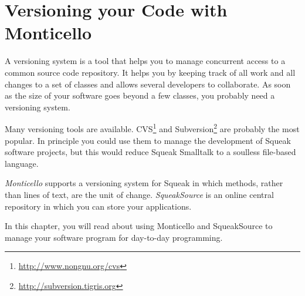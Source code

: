 \documentclass[a4paper,10pt,twoside]{book}
\begin{document}
	\sloppy
\fi

\newcommand{\figlabel}[1]{\label{fig:#1}}
\newcommand{\seclabel}[1]{\label{sec:#1}}

\chapter{Versioning your Code with Monticello}


\noindent
{}


A versioning system is a tool that helps you to manage concurrent access to a common source code repository. It helps you by keeping track of all work and all changes to a set of classes and allows several developers to collaborate. As soon as the size of your software goes beyond a few classes, you probably need a versioning system.

Many versioning tools are available. CVS\footnote{\url{http://www.nongnu.org/cvs}} and Subversion\footnote{\url{http://subversion.tigris.org}} are probably the most popular.
In principle you could use them to manage the development of Squeak software projects, but this would reduce Squeak Smalltalk to a soulless file-based language. 

\emph{Monticello} supports a versioning system for Squeak in which methods, rather than lines of text,
are the unit of change. \emph{SqueakSource} is an online central repository in which you can store your applications.

In this chapter, you will read about using Monticello and SqueakSource to manage your software program for day-to-day programming.
\end{document}
